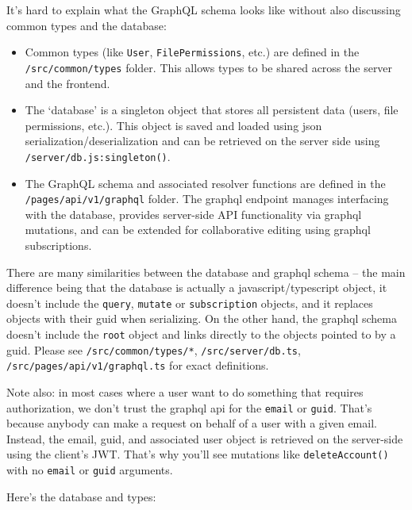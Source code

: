 It's hard to explain what the GraphQL schema looks like without also
discussing common types and the database:

\begin{itemize}
\tightlist
\item
  Common types (like \texttt{User}, \texttt{FilePermissions}, etc.) are
  defined in the \texttt{/src/common/types} folder. This allows types to
  be shared across the server and the frontend.
\item
  The `database' is a singleton object that stores all persistent data
  (users, file permissions, etc.). This object is saved and loaded using
  json serialization/deserialization and can be retrieved on the server
  side using \texttt{/server/db.js:singleton()}.
\item
  The GraphQL schema and associated resolver functions are defined in
  the \texttt{/pages/api/v1/graphql} folder. The graphql endpoint
  manages interfacing with the database, provides server-side API
  functionality via graphql mutations, and can be extended for
  collaborative editing using graphql subscriptions.
\end{itemize}

There are many similarities between the database and graphql schema --
the main difference being that the database is actually a
javascript/typescript object, it doesn't include the \texttt{query},
\texttt{mutate} or \texttt{subscription} objects, and it replaces
objects with their guid when serializing. On the other hand, the graphql
schema doesn't include the \texttt{root} object and links directly to
the objects pointed to by a guid. Please see
\texttt{/src/common/types/*}, \texttt{/src/server/db.ts},
\texttt{/src/pages/api/v1/graphql.ts} for exact definitions.

Note also: in most cases where a user want to do something that requires
authorization, we don't trust the graphql api for the \texttt{email} or
\texttt{guid}. That's because anybody can make a request on behalf of a
user with a given email. Instead, the email, guid, and associated user
object is retrieved on the server-side using the client's JWT. That's
why you'll see mutations like \texttt{deleteAccount()} with no
\texttt{email} or \texttt{guid} arguments.

Here's the database and types:

